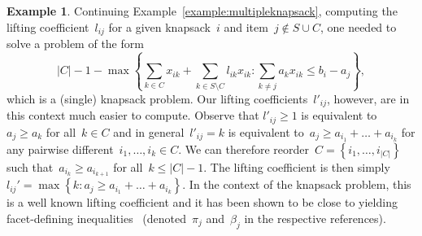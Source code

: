 \documentclass[a4paper,10pt]{article}
\newcommand{\lift}{l}
\newcommand{\brackets}[1]{\left\{ #1 \right\}}
\theoremstyle{definition}
\newtheorem{example}[theorem]{Example}
\begin{document}
\begin{example}
  Continuing Example~\ref{example:multipleknapsack}, computing the lifting coefficient~$\lift_{ij}$ for a given knapsack~$i$ and item~$j\notin S\cup C$, one needed to solve a problem of the form
  \begin{equation}
    |C| - 1 - 
    \max\brackets{
      \sum_{k\in C}x_{ik} + \sum_{k\in S\setminus C} \lift_{ik} x_{ik} :
      \sum_{k\neq j} a_k x_{ik} \leq b_i - a_j
    },
  \end{equation}
  which is a (single) knapsack problem.
  Our lifting coefficients~$\lift'_{ij}$, however, are in this context much easier to compute. 
  Observe that $\lift'_{ij} \geq 1$ is equivalent to~$a_j \geq a_k$ for all~$k\in C$ and in general~$\lift'_{ij} = k$ is equivalent to~$a_j \geq a_{i_1} +\dots + a_{i_k}$ for any pairwise different~$i_1, \ldots, i_k \in C$.
  We can therefore reorder~$C = \brackets{i_1, \dots, i_{|C|}}$ such that~$a_{i_k} \geq a_{i_{k+1}}$ for all~$k\leq |C| -1$.
  The lifting coefficient is then simply~$\lift_{ij}' = \max\brackets{k : a_j \geq a_{i_1} + \dots + a_{i_k}}$.
  In the context of the knapsack problem, this is a well known lifting coefficient and it has been shown to be close to yielding facet-defining inequalities~\cite{balas1978facets,nemhauser1994lifted} (denoted~$\pi_j$ and~$\beta_j$ in the respective references).
\end{example}
\end{document}

